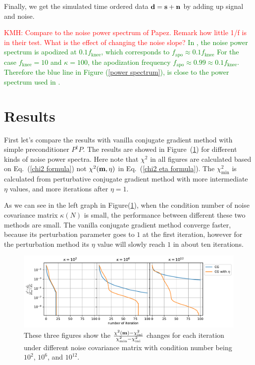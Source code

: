 \documentclass[twocolumn,linenumbers]{aastex631}
\newcommand{\vbd}{\vb{d}}
\newcommand{\vbm}{\vb{m}}
\newcommand{\Pdagger}{P^{\dagger}}
\newcommand{\kmh}[1]{\textcolor{red}{KMH: #1}}
\begin{document}
Finally, we get the simulated time ordered data $\vb{d} = \vb{s} + \vb{n}$ by
adding up signal and noise.

\kmh{Compare to the noise power spectrum of Papez. Remark how little 1/f is in their test.  What is the effect of changing the noise slope?}
\textcolor{green}{
In \citealt{2018A&A...620A..59P}, the noise power spectrum is apodized at $0.1f_\text{knee}$,
which corresponds to $f_\text{apo} \approx 0.1 f_\text{knee}$
For the case $f_\text{knee} = 10$ and $\kappa=100$,
the apodization frequency $f_\text{apo} \approx 0.99 \approx 0.1 f_\text{knee}$.
Therefore the blue line in Figure (\ref{power spectrum}), is close to the
power spectrum used in \citealt{2018A&A...620A..59P}.
}


\section{Results} \label{sec:results}
First let's compare the results with vanilla conjugate gradient method with
simple preconditioner $\Pdagger P$.
The results are showed in Figure~(\ref{f scan 0.1 CG}) for different kinds
of noise power spectra.
Here note that $\chi^2$ in all figures are calculated based on
Eq.~(\ref{chi2 formula})
not $\chi^2(\vbm, \eta)$ in Eq.~(\ref{chi2 eta formula}).
The $\chi^2_{\text{min}}$ is calculated from perturbative conjugate gradient
method with more intermediate $\eta$ values, and more iterations after
$\eta=1$.

As we can see in the left graph in Figure(\ref{f scan 0.1 CG}),
when the condition number of noise covariance matrix $\kappa(N)$ is small,
the performance between different these two methods are small.
The vanilla conjugate gradient method converge faster, because its perturbation
parameter goes to $1$ at the first iteration, however for the perturbation method its
$\eta$ value will slowly reach $1$ in about ten iterations.

\begin{figure}[htb!]
\centering
\includegraphics[width=\textwidth]{f_scan=0.1_CG.pdf}
\caption{These three figures show the 
$\frac{\chi^2(\vbm) - \chi^2_\text{ini}}{\chi^2_\text{min} - \chi^2_\text{ini}}$
changes for each iteration under different noise covariance matrix with
condition number being $10^2$, $10^6$, and $10^{12}$.
}
\label{f scan 0.1 CG}
\end{figure}
\end{document}
